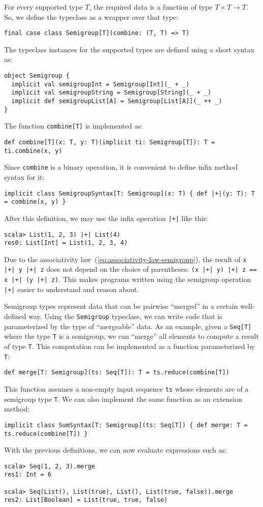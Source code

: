 For every supported type $T$, the required data is a function of
type $T\times T\rightarrow T$. So, we define the typeclass as a wrapper
over that type:
\begin{lstlisting}
final case class Semigroup[T](combine: (T, T) => T)
\end{lstlisting}
The typeclass instances for the supported types are defined using
a short syntax as:
\begin{lstlisting}
object Semigroup {
  implicit val semigroupInt = Semigroup[Int](_ + _)
  implicit val semigroupString = Semigroup[String](_ + _)
  implicit def semigroupList[A] = Semigroup[List[A]](_ ++ _)
}
\end{lstlisting}
The function \lstinline!combine[T]! is implemented as:
\begin{lstlisting}
def combine[T](x: T, y: T)(implicit ti: Semigroup[T]): T = ti.combine(x, y)
\end{lstlisting}
Since \lstinline!combine! is a binary operation, it is convenient
to define infix method syntax for it:
\begin{lstlisting}
implicit class SemigroupSyntax[T: Semigroup](x: T) { def |+|(y: T): T = combine(x, y) }
\end{lstlisting}
After this definition, we may use the infix operation \lstinline!|+|!
like this:
\begin{lstlisting}
scala> List(1, 2, 3) |+| List(4)
res0: List[Int] = List(1, 2, 3, 4)
\end{lstlisting}
Due to the associativity law~(\ref{eq:associativity-law-semigroup}),
the result of \lstinline!x |+| y |+| z! does not depend on the choice
of parentheses: \lstinline!(x |+| y) |+| z == x |+| (y |+| z)!. This
makes programs written using the semigroup operation \lstinline!|+|!
easier to understand and reason about.

Semigroup types represent data that can be pairwise \textsf{``}merged\textsf{''} in
a certain well-defined way. Using the \lstinline!Semigroup! typeclass,
we can write code that is parameterized by the type of \textsf{``}mergeable\textsf{''}
data. As an example, given a \lstinline!Seq[T]! where the type \lstinline!T!
is a semigroup, we can \textsf{``}merge\textsf{''} all elements to compute a result
of type \lstinline!T!. This computation can be implemented as a function
parameterized by \lstinline!T!:
\begin{lstlisting}
def merge[T: Semigroup](ts: Seq[T]): T = ts.reduce(combine[T])
\end{lstlisting}
This function assumes a non-empty input sequence \lstinline!ts! whose
elements are of a semigroup type \lstinline!T!. We can also implement
the same function as an extension method:
\begin{lstlisting}
implicit class SumSyntax[T: Semigroup](ts: Seq[T]) { def merge: T = ts.reduce(combine[T]) }
\end{lstlisting}
With the previous definitions, we can now evaluate expressions such
as:
\begin{lstlisting}
scala> Seq(1, 2, 3).merge
res1: Int = 6

scala> Seq(List(), List(true), List(), List(true, false)).merge
res2: List[Boolean] = List(true, true, false)
\end{lstlisting}

